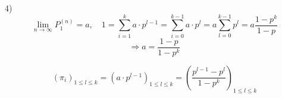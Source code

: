 \begin{paragraph}{4)}
   \[ \lim_{n\rightarrow\infty} P_{1}^{(n)} = a, \quad
      1 = \sum_{i=1}^{k} a \cdot p^{l-1} = \sum_{i=0}^{k-1} a \cdot p^{l} = a
   \sum_{l=0}^{k-1} p^{l} = a \frac{1-p^{k}}{1-p} \]
  \[ \Rightarrow a = \frac{1-p}{1-p^{k}} \]

  \[ (\pi_{i})_{1\leq l\leq k} = (a\cdot p^{l-1})_{1\leq l\leq k} 
     = (\frac{p^{l-1} - p^{l}}{1-p^{k}})_{1\leq l\leq k} \]
\end{paragraph}

